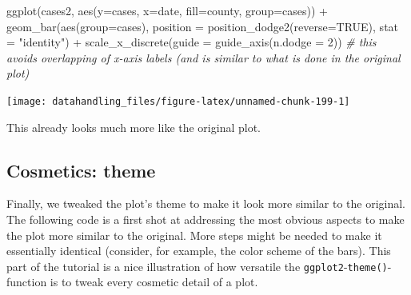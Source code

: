 \documentclass[
  12pt,
]{style/krantz}
\newenvironment{Shaded}{\begin{snugshade}}{\end{snugshade}}
\newcommand{\AttributeTok}[1]{\textcolor[rgb]{0.77,0.63,0.00}{#1}}
\newcommand{\CommentTok}[1]{\textcolor[rgb]{0.56,0.35,0.01}{\textit{#1}}}
\newcommand{\ConstantTok}[1]{\textcolor[rgb]{0.00,0.00,0.00}{#1}}
\newcommand{\DecValTok}[1]{\textcolor[rgb]{0.00,0.00,0.81}{#1}}
\newcommand{\FunctionTok}[1]{\textcolor[rgb]{0.00,0.00,0.00}{#1}}
\newcommand{\NormalTok}[1]{#1}
\newcommand{\SpecialCharTok}[1]{\textcolor[rgb]{0.00,0.00,0.00}{#1}}
\newcommand{\StringTok}[1]{\textcolor[rgb]{0.31,0.60,0.02}{#1}}
\begin{document}
\begin{Shaded}
\begin{Highlighting}[]
\FunctionTok{ggplot}\NormalTok{(cases2, }\FunctionTok{aes}\NormalTok{(}\AttributeTok{y=}\NormalTok{cases, }\AttributeTok{x=}\NormalTok{date, }\AttributeTok{fill=}\NormalTok{county, }\AttributeTok{group=}\NormalTok{cases)) }\SpecialCharTok{+}
  \FunctionTok{geom\_bar}\NormalTok{(}\FunctionTok{aes}\NormalTok{(}\AttributeTok{group=}\NormalTok{cases), }\AttributeTok{position =} \FunctionTok{position\_dodge2}\NormalTok{(}\AttributeTok{reverse=}\ConstantTok{TRUE}\NormalTok{), }\AttributeTok{stat =} \StringTok{"identity"}\NormalTok{) }\SpecialCharTok{+}
    \FunctionTok{scale\_x\_discrete}\NormalTok{(}\AttributeTok{guide =} \FunctionTok{guide\_axis}\NormalTok{(}\AttributeTok{n.dodge =} \DecValTok{2}\NormalTok{))  }\CommentTok{\# this avoids overlapping of x{-}axis labels (and is similar to what is done in the original plot)}
\end{Highlighting}
\end{Shaded}

\texttt{[image: datahandling\_files/figure-latex/unnamed-chunk-199-1]}

This already looks much more like the original plot.

\hypertarget{cosmetics-theme}{%
\subsection{Cosmetics: theme}\label{cosmetics-theme}}

Finally, we tweaked the plot's theme to make it look more similar to the original. The following code is a first shot at addressing the most obvious aspects to make the plot more similar to the original. More steps might be needed to make it essentially identical (consider, for example, the color scheme of the bars). This part of the tutorial is a nice illustration of how versatile the \texttt{ggplot2}-\texttt{theme()}-function is to tweak every cosmetic detail of a plot.
\end{document}
